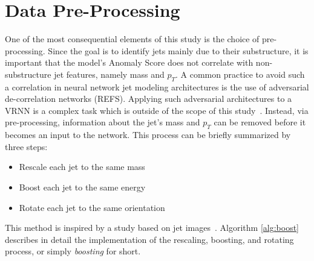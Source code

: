 \documentclass[12pt, a4paper]{article}
\begin{document}

\section{Data Pre-Processing}

One of the most consequential elements of this study is the choice of pre-processing. Since the goal is to identify jets mainly due to their substructure, it is important that the model's Anomaly Score does not correlate with non-substructure jet features, namely mass and $p_{T}$. A common practice to avoid such a correlation in neural network jet modeling architectures is the use of adversarial de-correlation networks (REFS). Applying such adversarial architectures to a VRNN is a complex task which is outside of the scope of this study~\cite{Purushotham2017VariationalRA}. Instead, via pre-processing, information about the jet's mass and $p_{T}$ can be removed before it becomes an input to the network. This process can be briefly summarized by three steps:

\begin{itemize}
	\item{Rescale each jet to the same mass}
	\item{Boost each jet to the same energy}
	\item{Rotate each jet to the same orientation}
\end{itemize}

This method is inspired by a study based on jet images~\cite{roy2020robust}. Algorithm \ref{alg:boost} describes in detail the implementation of the rescaling, boosting, and rotating process, or simply \textit{boosting} for short. 
\end{document}
